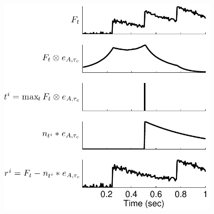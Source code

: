 \documentclass[12pt]{article}
\begin{document}
\begin{figure} \centering
\includegraphics[height=0.8\textheight]{ppr_schem}
\end{figure}


\newpage

%

\end{document}
